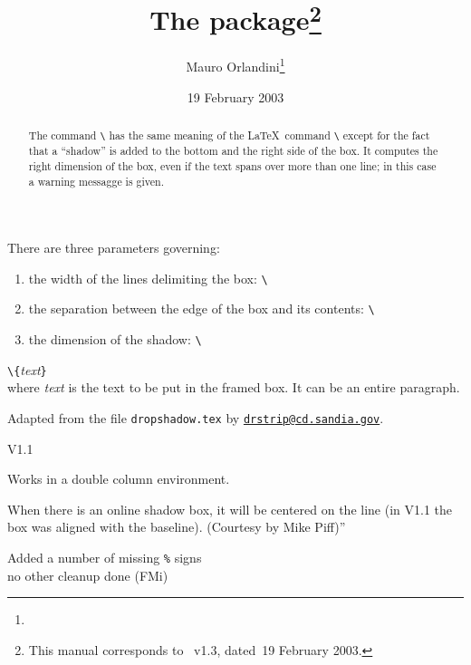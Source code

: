 \documentclass[pagesize=auto, fontsize=12pt, DIV=10, parskip=half]{scrartcl}
\title{The \pkg{shadow} package\thanks{This manual corresponds to \pkg{shadow.sty}~v1.3, dated~19 February 2003.}}
\author{Mauro Orlandini\thanks{\mail{orlandini@bo.iasf.cnr.it}}}
\date{19 February 2003}
\makeatletter
\newcommand*{\mail}[1]{\href{mailto:#1}{\texttt{#1}}}
\newcommand*{\cs}[1]{\texttt{\textbackslash#1}}
\newcommand*{\cmd}[1]{\cs{\expandafter\@gobble\string#1}}
\newcommand*{\meta}[1]{\textlangle\textsl{#1}\textrangle}
\newcommand*{\marg}[1]{\texttt{\{}\meta{#1}\texttt{\}}}
\makeatother
\begin{document}
\maketitle

\begin{abstract}
  \noindent
  The command \cmd{\shabox} has the same meaning of the
  \LaTeX\ command \cmd{\fbox} except for the fact that a
  ``shadow'' is added to the bottom and the right side
  of the box. It computes the right dimension of the
  box, even if the text spans over more than one
  line; in this case a warning messagge is given.
\end{abstract}

There are three parameters governing:
%
\begin{enumerate}
\item the width of the lines delimiting the box:
  \cmd{\sboxrule}
\item the separation between the edge of the box and
  its contents: \cmd{\sboxsep}
\item the dimension of the shadow: \cmd{\sdim}
\end{enumerate}



\cmd{\shabox}\marg{text}\\
where \meta{text} is the text to be put in the
framed box. It can be an entire paragraph.

Adapted from the file \texttt{dropshadow.tex} by
\mail{drstrip@cd.sandia.gov}.
%
\begin{labeling}{V1.1}
\item[V1.1] Works in a double column environment.
\item[V1.2] When there is an online shadow box, it
  will be centered on the line (in V1.1 the
  box was aligned with the baseline).
  (Courtesy by Mike Piff)''
\item[V1.3] Added a number of missing \verb|%| signs\\
  no other cleanup done (FMi)
\end{labeling}
\end{document}
